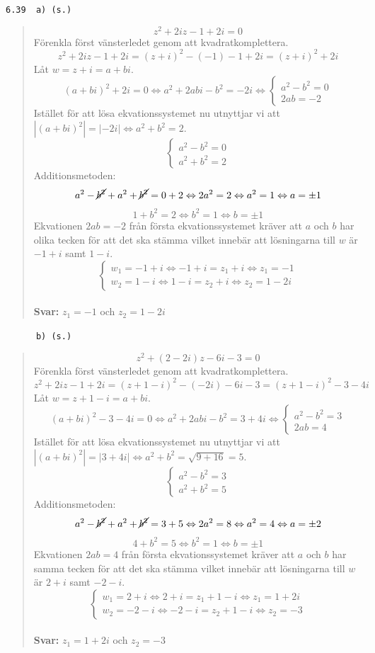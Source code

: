 \documentclass[a4paper]{article}
\newcommand{\tskcol}[1]{\textcolor{tskcol}{#1}}
\begin{document}
	\pagebreak
	\texttt{\tskcol{6.39~~a) (s.)}}
	\begin{quotation}
		\noindent
		\[z^2+2iz-1+2i=0\]
		Förenkla först vänsterledet genom att kvadratkomplettera.
		\[z^2+2iz-1+2i=(z+i)^2-(-1)-1+2i=(z+i)^2+2i\]
		Låt $w=z+i=a+bi$.
		\[(a+bi)^2+2i=0 \Leftrightarrow
		a^2+2abi-b^2=-2i\Leftrightarrow
		\begin{cases}
		a^2-b^2=0 \\
		2ab=-2
		\end{cases}\]
		Istället för att lösa ekvationssystemet nu utnyttjar vi  att $|(a+bi)^2|=|-2i| \Leftrightarrow a^2+b^2=2$.
		\[\begin{cases}
		a^2-b^2 = 0 \\
		a^2+b^2 = 2
		\end{cases}\]
		Additionsmetoden:
		\[a^2-\cancel{b^2}+a^2+\cancel{b^2} = 0+2 \Leftrightarrow
		2a^2=2 \Leftrightarrow
		a^2=1 \Leftrightarrow
		a=\pm1\]
		\[1+b^2=2 \Leftrightarrow
		b^2=1 \Leftrightarrow
		b=\pm 1\]
		Ekvationen $2ab=-2$ från första ekvationssystemet kräver att $a$ och $b$ har olika tecken för att det ska stämma vilket innebär att lösningarna till $w$ är $-1+i$ samt $1-i$.
		\[\begin{cases}
		w_1=-1+i \Leftrightarrow -1+i=z_1+i \Leftrightarrow z_1=-1 \\
		w_2=1-i \Leftrightarrow 1-i=z_2+i \Leftrightarrow z_2=1-2i
		\end{cases}\]
		\\
		\textbf{Svar:} $z_1=-1$ och $z_2=1-2i$
	\end{quotation}
	
	\pagebreak
	\texttt{\tskcol{~~~~~~b) (s.)}}
	\begin{quotation}
		\noindent
		\[z^2+(2-2i)z-6i-3=0\]
		Förenkla först vänsterledet genom att kvadratkomplettera.
		\[z^2+2iz-1+2i=(z+1-i)^2-(-2i)-6i-3=(z+1-i)^2-3-4i\]
		Låt $w=z+1-i=a+bi$.
		\[(a+bi)^2-3-4i=0 \Leftrightarrow
		a^2+2abi-b^2=3+4i\Leftrightarrow
		\begin{cases}
		a^2-b^2=3 \\
		2ab=4
		\end{cases}\]
		Istället för att lösa ekvationssystemet nu utnyttjar vi  att $|(a+bi)^2|=|3+4i| \Leftrightarrow a^2+b^2=\sqrt{9+16}=5$.
		\[\begin{cases}
		a^2-b^2 = 3 \\
		a^2+b^2 = 5
		\end{cases}\]
		Additionsmetoden:
		\[a^2-\cancel{b^2}+a^2+\cancel{b^2} = 3+5 \Leftrightarrow
		2a^2=8 \Leftrightarrow
		a^2=4 \Leftrightarrow
		a=\pm2\]
		\[4+b^2=5 \Leftrightarrow
		b^2=1 \Leftrightarrow
		b=\pm 1\]
		Ekvationen $2ab=4$ från första ekvationssystemet kräver att $a$ och $b$ har samma tecken för att det ska stämma vilket innebär att lösningarna till $w$ är $2+i$ samt $-2-i$.
		\[\begin{cases}
		w_1=2+i \Leftrightarrow 2+i=z_1+1-i \Leftrightarrow z_1=1+2i \\
		w_2=-2-i \Leftrightarrow -2-i=z_2+1-i \Leftrightarrow z_2=-3
		\end{cases}\]
		\\
		\textbf{Svar:} $z_1=1+2i$ och $z_2=-3$
	\end{quotation}
	
\end{document}
